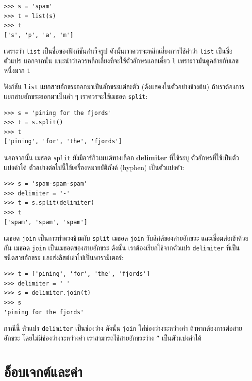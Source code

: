 \begin{verbatim}
>>> s = 'spam'
>>> t = list(s)
>>> t
['s', 'p', 'a', 'm']
\end{verbatim}
%
เพราะว่า \texttt{list} เป็นชื่อของฟังก์ชันสำเร็จรูป
ดังนั้นเราควรจะหลีกเลี่ยงการใช้คำว่า \texttt{list} เป็นชื่อตัวแปร
นอกจากนั้น แนะนำว่าควรหลีกเลี่ยงที่จะใช้ตัวอักษรแอลเดี่ยว \texttt{l}
เพราะว่ามันดูคล้ายกับเลขหนึ่งมาก \texttt{1} 

ฟังก์ชัน \texttt{list} แยกสายอักขระออกมาเป็นอักขระแต่ละตัว (ดังแสดงในตัวอย่างข้างต้น)
ถ้าเราต้องการแยกสายอักขระออกมาเป็นคำ ๆ เราควรจะใช้เมธอด \texttt{split}:
%

\begin{verbatim}
>>> s = 'pining for the fjords'
>>> t = s.split()
>>> t
['pining', 'for', 'the', 'fjords']
\end{verbatim}
%
นอกจากนั้น เมธอด \texttt{split} ยังมีอาร์กิวเมนต์ทางเลือก \textbf{delimiter} ที่ใช้ระบุ
ตัวอักษรที่ใช้เป็นตัวแบ่งคำได้
ตัวอย่างต่อไปนี้ใช้เครื่องหมายยัติภังค์ (hyphen) เป็นตัวแบ่งคำ:

\begin{verbatim}
>>> s = 'spam-spam-spam'
>>> delimiter = '-'
>>> t = s.split(delimiter)
>>> t
['spam', 'spam', 'spam']
\end{verbatim}
%
เมธอด \texttt{join} เป็นการทำตรงข้ามกับ \texttt{split}  
เมธอด \texttt{join} รับลิสต์ของสายอักขระ
และเชื่อมต่อเข้าด้วยกัน
เมธอด \texttt{join} เป็นเมธอดของสายอักขระ
ดังนั้น เราต้องเรียกใช้จากตัวแปร \texttt{delimiter} ที่เป็นชนิดสายอักขระ
และส่งลิสต์เข้าไปเป็นพารามิเตอร์:

\begin{verbatim}
>>> t = ['pining', 'for', 'the', 'fjords']
>>> delimiter = ' '
>>> s = delimiter.join(t)
>>> s
'pining for the fjords'
\end{verbatim}
%
กรณีนี้ ตัวแปร \texttt{delimiter} เป็นช่องว่าง
ดังนั้น \texttt{join} ใส่ช่องว่างระหว่างคำ
ถ้าหากต้องการต่อสายอักขระ โดยไม่มีช่องว่างระหว่างคำ
เราสามารถใช้สายอักขระว่าง \texttt{''} เป็นตัวแบ่งคำได้ 


\section{อ็อบเจกต์และค่า}
\label{equivalence}

